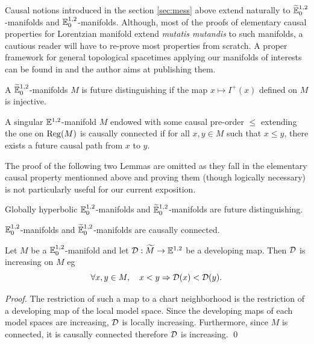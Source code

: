 Causal notions introduced in the section \ref{sec:mess} above extend naturally to ${\widetilde {\mathbb{E}}}^{1,2}_0$-manifolds and $\mathbb{E}^{1,2}_0$-manifolds. Although, most of the proofs of elementary causal properties for Lorentzian manifold extend {\it mutatis mutandis} to such manifolds, a cautious reader will have to re-prove most properties from scratch. A proper framework for general topological spacetimes applying our manifolds of interests can be found in \cite{thesis} and the author aims at publishing them. 
\begin{defi}\label{def:manifolds_future_distinguishing_map} A ${\widetilde {\mathbb{E}}}^{1,2}_0$-manifolds $M$ is future distinguishing if the map $x\mapsto I^+(x)$ defined on $M$ is injective.
\end{defi}
\begin{defi}\label{def:singular_manifold_endowed_causal}
 A singular ${\mathbb E}^{1,2}_{}$-manifold $M$ endowed with some causal pre-order $\leq$ extending the one on $\mathrm{Reg}(M)$ is causally connected if 
for all $x,y\in M$ such that  $x\leq y$, there exists a future causal path from $x$ to $y$.
\end{defi}
The proof of the following two Lemmas are omitted as they fall in the elementary causal property mentionned above and proving them (though logically necessary) is not particularly useful for our current exposition.

\begin{lem}\label{lem:globally_hyperbolic_manifolds_manifolds} Globally hyperbolic  $\mathbb{E}^{1,2}_0$-manifolds and ${\widetilde {\mathbb{E}}}^{1,2}_0$-manifolds are future distinguishing.
\end{lem}


\begin{lem}\label{lem:manifolds_manifolds_causally_connected} $\mathbb{E}^{1,2}_0$-manifolds and ${\widetilde {\mathbb{E}}}^{1,2}_0$-manifolds are causally connected.
\end{lem}



\begin{lem}\label{lem:increasing_map} Let $M$ be a  $\mathbb{E}^{1,2}_0$-manifold and let $\mathcal{D}:\widetilde M\rightarrow {\mathbb E}^{1,2}_{}$ be a developing map.
Then $\mathcal{D}$ is  increasing on $M$ eg
$$\forall x,y\in M, \quad x<y \Rightarrow \mathcal{D}(x)<\mathcal{D}(y).$$
\end{lem}
\begin{proof} 
 The restriction of such a map to a chart neighborhood is the restriction of a developing map of the local model space. Since the developing maps of each model spaces are  increasing, $\mathcal{D}$ is locally increasing. Furthermore, since $M$ is connected, it is causally connected therefore $\mathcal{D}$ is increasing.
\qed\end{proof}


